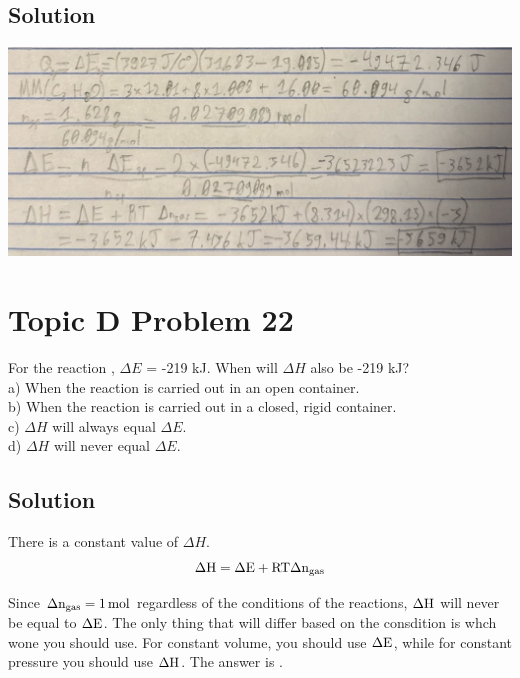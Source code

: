 \documentclass[10pt]{article}
\begin{document}
        \subsection{Solution}
            \begin{center}
                \includegraphics[width=\textwidth]{Answers Images/Problem 21.jpg}
            \end{center}

    \pagebreak
    \section{Topic D Problem 22}
        For the reaction , $\Delta E$ = -219 kJ. When will $\Delta H$ also be -219 kJ?\\
        a) When the reaction is carried out in an open container.\\
        b) When the reaction is carried out in a closed, rigid container.\\
        c) $\Delta H$ will always equal $\Delta E$.\\
        d) $\Delta H$ will never equal $\Delta E$.
        
        \subsection{Solution}
            There is a constant value of $\Delta H$.
            \begin{equation}
                \rm
                \Delta H    =   \Delta E + RT \Delta n_{gas}
            \end{equation}

            Since $\rm \Delta n_{gas} = 1\,\unit{\mole}$ regardless of the conditions of the reactions, $\rm \Delta H$ will never be equal to $\rm \Delta E$.
            The only thing that will differ based on the consdition is whch wone you should use.
            For constant volume, you should use $\rm \Delta E$, while for constant pressure you should use $\rm \Delta H$.
            The answer is . 
    
    \pagebreak
    \tableofcontents
\end{document}
